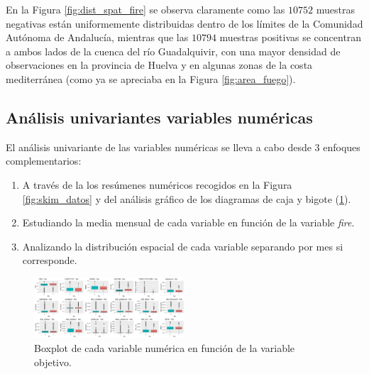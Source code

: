 \documentclass[12pt,a4paper,]{book}
\numberwithin{dummy}{section}
\theoremstyle{ocrenumbox}
\theoremstyle{blacknumex}
\theoremstyle{blacknumbox}
\theoremstyle{ocrenum}
\theoremstyle{ocrenum}
\begin{document}
En la Figura \ref{fig:dist_spat_fire} se observa claramente como las
\(10752\) muestras negativas están uniformemente distribuidas dentro de
los límites de la Comunidad Autónoma de Andalucía, mientras que las
\(10794\) muestras positivas se concentran a ambos lados de la cuenca
del río Guadalquivir, con una mayor densidad de observaciones en la
provincia de Huelva y en algunas zonas de la costa mediterránea (como ya
se apreciaba en la Figura \ref{fig:area_fuego}).

\hypertarget{anuxe1lisis-univariantes-variables-numuxe9ricas}{%
\subsection{Análisis univariantes variables
numéricas}\label{anuxe1lisis-univariantes-variables-numuxe9ricas}}

El análisis univariante de las variables numéricas se lleva a cabo desde
3 enfoques complementarios:

\begin{enumerate}
\def\labelenumi{\arabic{enumi}.}
\item
  A través de la los resúmenes numéricos recogidos en la Figura
  \ref{fig:skim_datos} y del análisis gráfico de los diagramas de caja y
  bigote (\ref{fig:boxplots}).
\item
  Estudiando la media mensual de cada variable en función de la variable
  \emph{fire}.
\item
  Analizando la distribución espacial de cada variable separando por mes
  si corresponde.
\end{enumerate}

\begin{figure}[]
\centering
\includegraphics[width =0.5\textwidth]{graficos/boxplots.png}
\caption{Boxplot de cada variable numérica en función de la variable objetivo.}
\label{fig:boxplots}
\end{figure}
\end{document}
